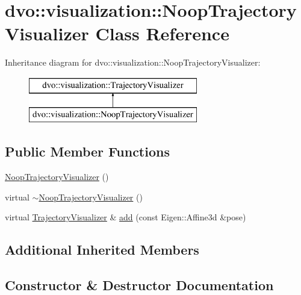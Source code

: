\hypertarget{classdvo_1_1visualization_1_1_noop_trajectory_visualizer}{}\section{dvo\+:\+:visualization\+:\+:Noop\+Trajectory\+Visualizer Class Reference}
\label{classdvo_1_1visualization_1_1_noop_trajectory_visualizer}
Inheritance diagram for dvo\+:\+:visualization\+:\+:Noop\+Trajectory\+Visualizer\+:\begin{figure}[H]
\begin{center}
\leavevmode
\includegraphics[height=2.000000cm]{classdvo_1_1visualization_1_1_noop_trajectory_visualizer}
\end{center}
\end{figure}
\subsection*{Public Member Functions}
\begin{DoxyCompactItemize}
\item 
\mbox{\hyperlink{classdvo_1_1visualization_1_1_noop_trajectory_visualizer_a215b180a6d70948c2448ed7d0edc0852}{Noop\+Trajectory\+Visualizer}} ()
\item 
virtual \mbox{\hyperlink{classdvo_1_1visualization_1_1_noop_trajectory_visualizer_a2f3efe6c4bb5b294c72c594ef13060ca}{$\sim$\+Noop\+Trajectory\+Visualizer}} ()
\item 
virtual \mbox{\hyperlink{classdvo_1_1visualization_1_1_trajectory_visualizer}{Trajectory\+Visualizer}} \& \mbox{\hyperlink{classdvo_1_1visualization_1_1_noop_trajectory_visualizer_a40e9cfd01744c3efa85afb93237e2030}{add}} (const Eigen\+::\+Affine3d \&pose)
\end{DoxyCompactItemize}
\subsection*{Additional Inherited Members}


\subsection{Constructor \& Destructor Documentation}
\mbox{\label{classdvo_1_1visualization_1_1_noop_trajectory_visualizer_a215b180a6d70948c2448ed7d0edc0852}} 
